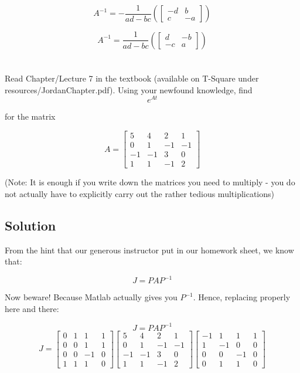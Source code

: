 \documentclass[10pt,a4paper]{article}
\begin{document}
\[ A^{-1} = - \dfrac{1}{ad-bc}\left ( 
\begin{bmatrix}
-d & b \\
 c & -a
\end{bmatrix}
\right ) \]

\[ A^{-1} = \dfrac{1}{ad-bc}\left ( 
\begin{bmatrix}
d & -b \\
-c & a
\end{bmatrix}
\right ) \]

\section{}
Read Chapter/Lecture 7 in the textbook (available on T-Square under resources/JordanChapter.pdf). Using your newfound knowledge, find
\[ e^{At} \]

for the matrix

\[ A = 
\begin{bmatrix}
5 & 4 & 2 & 1 \\
0 & 1 & -1 & -1 \\
-1 & -1 & 3 & 0 \\
1 & 1 & -1 & 2
\end{bmatrix}
\]

(Note: It is enough if you write down the matrices you need to multiply - you do not actually have to explicitly carry out the rather tedious multiplications)

\subsection*{Solution}
From the hint that our generous instructor put in our homework sheet, we know that:

\[ J = PAP^{-1} \]

Now beware! Because Matlab actually gives you $P^{-1}$. Hence, replacing properly here and there:

\[ J = PAP^{-1} \]
\[
J = 
\begin{bmatrix}
   0 &  1 &  1 &  1 \\
   0 &  0 &  1 &  1 \\ 
   0 &  0 & -1 &  0 \\
   1 &  1 &  1 &  0
\end{bmatrix}
\begin{bmatrix}
   5 &  4 &  2 &  1 \\
   0 &  1 & -1 & -1 \\
  -1 & -1 &  3 &  0 \\
   1 &  1 & -1 &  2
\end{bmatrix}
\begin{bmatrix}
  -1 &  1 &  1 & 1 \\
   1 & -1 &  0 & 0 \\
   0 &  0 & -1 & 0 \\
   0 &  1 &  1 & 0 
\end{bmatrix}
\]
\end{document}
